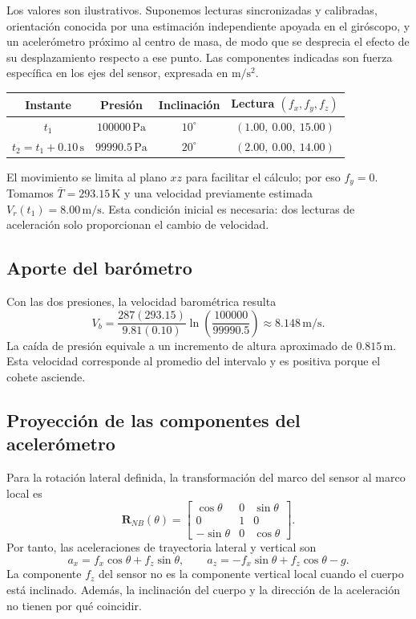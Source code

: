 \documentclass[11pt,a4paper]{article}
\begin{document}
Los valores son ilustrativos. Suponemos lecturas sincronizadas y calibradas, orientación conocida por una estimación independiente apoyada en el giróscopo, y un acelerómetro próximo al centro de masa, de modo que se desprecia el efecto de su desplazamiento respecto a ese punto. Las componentes indicadas son fuerza específica en los ejes del sensor, expresada en $\mathrm{m/s^2}$.
\begin{center}
\begin{tabular}{c|c|c|c}
Instante & Presión & Inclinación & Lectura $(f_x,f_y,f_z)$ \\
\hline
$t_1$ & $100000\,\mathrm{Pa}$ & $10^\circ$ & $(1.00,\ 0.00,\ 15.00)$ \\
$t_2=t_1+0.10\,\mathrm{s}$ & $99990.5\,\mathrm{Pa}$ & $20^\circ$ & $(2.00,\ 0.00,\ 14.00)$
\end{tabular}
\end{center}
El movimiento se limita al plano $xz$ para facilitar el cálculo; por eso $f_y=0$. Tomamos $\bar T=293.15\,\mathrm{K}$ y una velocidad previamente estimada $V_r(t_1)=8.00\,\mathrm{m/s}$. Esta condición inicial es necesaria: dos lecturas de aceleración solo proporcionan el cambio de velocidad.

\subsection{Aporte del barómetro}
Con las dos presiones, la velocidad barométrica resulta
\begin{equation}
 V_b=\frac{287(293.15)}{9.81(0.10)}
 \ln\left(\frac{100000}{99990.5}\right)
 \approx8.148\,\mathrm{m/s}.
\end{equation}
La caída de presión equivale a un incremento de altura aproximado de $0.815\,\mathrm{m}$. Esta velocidad corresponde al promedio del intervalo y es positiva porque el cohete asciende.

\subsection{Proyección de las componentes del acelerómetro}
Para la rotación lateral definida, la transformación del marco del sensor al marco local es
\begin{equation}
 \mathbf R_{NB}(\theta)=
 \begin{bmatrix}
 \cos\theta&0&\sin\theta\\
 0&1&0\\
 -\sin\theta&0&\cos\theta
 \end{bmatrix}.
\end{equation}
Por tanto, las aceleraciones de trayectoria lateral y vertical son
\begin{equation}
 a_x=f_x\cos\theta+f_z\sin\theta,\qquad
 a_z=-f_x\sin\theta+f_z\cos\theta-g.
\end{equation}
La componente $f_z$ del sensor no es la componente vertical local cuando el cuerpo está inclinado. Además, la inclinación del cuerpo y la dirección de la aceleración no tienen por qué coincidir.
\end{document}
